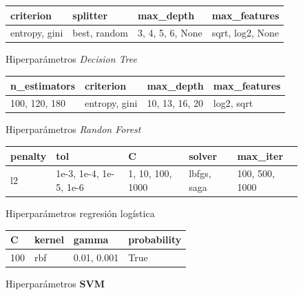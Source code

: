 \begin{appendices}
		\begin{figure}[ht!]
			\centering
			\begin{tabular}{llll}
				\toprule
						criterion &        splitter &           max\_depth &      max\_features \\
				\midrule
				  entropy, gini &  best, random &  3, 4, 5, 6, None &  sqrt, log2, None \\
				\bottomrule
			\end{tabular}
			\caption{Hiperparámetros \emph{Decision Tree}}
			\label{table:8}
		\end{figure}
		
		\begin{figure}[ht!]
			\centering
			\begin{tabular}{llll}
				\toprule
					 n\_estimators &        criterion &          max\_depth &  max\_features \\
				\midrule
				  100, 120, 180 &  entropy, gini &  10,  13, 16, 20 &  log2, sqrt \\
				\bottomrule
			\end{tabular}
			\caption{Hiperparámetros \emph{Randon Forest}}
			\label{table:9}
		\end{figure}

		\begin{figure}[ht!]
			\centering
			\begin{tabular}{lllll}
				\toprule
				 penalty &                       tol &                   C &         solver &        max\_iter \\
				\midrule
					l2 &  1e-3, 1e-4, 1e-5, 1e-6 &  1, 10, 100, 1000 &  lbfgs, saga &  100, 500, 1000 \\
				\bottomrule
			\end{tabular}
			\caption{Hiperparámetros regresión logística}
			\label{table:10}
		\end{figure}
		\newpage

		\begin{figure}[ht!]
			\centering
			\begin{tabular}{llll}
				\toprule
					  C & kernel &          gamma &  probability \\
				\midrule
				  100 &  rbf &  0.01, 0.001 &         True \\
				\bottomrule
			\end{tabular}
			\caption{Hiperparámetros \textbf{SVM}}
			\label{table:11}
		\end{figure}
		\newpage


\end{appendices}
